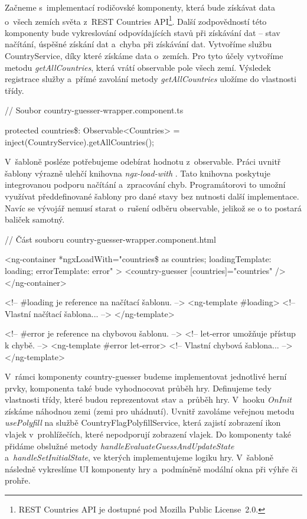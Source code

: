 Začneme s~implementací rodičovské komponenty, která bude získávat data o~všech zemích světa z~REST Countries API\footnote{REST Countries API je dostupné pod Mozilla Public License~2.0.\cite{restcountriesapi}}. 
Další zodpovědností této komponenty bude vykreslování odpovídajících stavů při získávání dat -- stav načítání, úspěšné získání dat a~chyba při získávání dat. 
Vytvoříme službu CountryService, díky které získáme data o~zemích. Pro tyto účely vytvoříme metodu \emph{getAllCountries}, která vrátí observable pole všech zemí. 
Výsledek registrace služby a~přímé zavolání metody \emph{getAllCountries} uložíme do vlastnosti třídy.

\begin{prog}
// Soubor country-guesser-wrapper.component.ts

protected countries\$: Observable<Countries> 
  = inject(CountryService).getAllCountries();
\end{prog}

V~šabloně posléze potřebujeme odebírat hodnotu z~observable. Práci uvnitř šablony výrazně ulehčí knihovna \emph{ngx-load-with} \cite{ngxloadwith}. 
Tato knihovna poskytuje integrovanou podporu načítání a~zpracování chyb. Programátorovi to umožní využívat předdefinované šablony pro dané stavy bez nutnosti další implementace. 
Navíc se vývojář nemusí starat o~rušení odběru observable, jelikož se o to postará baliček samotný.

\begin{prog}
// Část souboru country-guesser-wrapper.component.html

<ng-container
  *ngxLoadWith="countries\$ as countries; 
  loadingTemplate: loading; errorTemplate: error"
>
  <country-guesser [countries]="countries" />
</ng-container>

<!-- \#loading je reference na načítací šablonu. -->
<ng-template \#loading>
  <!-- Vlastní načítací šablona... -->
</ng-template>

<!-- \#error je reference na chybovou šablonu. -->
<!-- let-error umožňuje přístup k chybě. -->
<ng-template \#error let-error>
  <!-- Vlastní chybová šablona... -->
</ng-template>
\end{prog}

V~rámci komponenty country-guesser budeme implementovat jednotlivé herní prvky, komponenta také bude vyhodnocovat průběh hry. 
Definujeme tedy vlastnosti třídy, které budou reprezentovat stav a~průběh hry. V~hooku \emph{OnInit} získáme náhodnou zemi (zemi pro uhádnutí). 
Uvnitř zavoláme veřejnou metodu \emph{usePolyfill} na službě CountryFlagPolyfillService, která zajistí zobrazení ikon vlajek v~prohlížečích, které nepodporují zobrazení vlajek.
Do komponenty také přidáme obslužné metody \emph{handleEvaluateGuessAndUpdateState} a~\emph{handleSetInitialState}, ve kterých implementujeme logiku hry. 
V~šabloně následně vykreslíme UI komponenty hry a~podmíněně modální okna při výhře či prohře.

